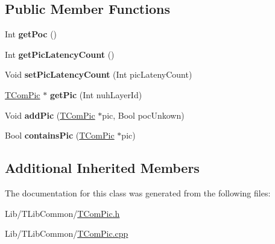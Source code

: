 \subsection*{Public Member Functions}
\begin{DoxyCompactItemize}
\item 
\mbox{\label{class_t_com_au_a420bdb61000304b8cd99b3882d5ed39a}} 
Int {\bfseries get\+Poc} ()
\item 
\mbox{\label{class_t_com_au_a7ca4e89ce5b5338c6aeb6eedb82ace1d}} 
Int {\bfseries get\+Pic\+Latency\+Count} ()
\end{DoxyCompactItemize}
{\bf }\par
\begin{DoxyCompactItemize}
\item 
\mbox{\label{class_t_com_au_a7938ae0485f1a9bbc0e04e8a3f72220d}} 
Void {\bfseries set\+Pic\+Latency\+Count} (Int pic\+Lateny\+Count)
\item 
\mbox{\label{class_t_com_au_a15ad28d9f7c42514989948eeb9680459}} 
\hyperlink{class_t_com_pic}{T\+Com\+Pic} $\ast$ {\bfseries get\+Pic} (Int nuh\+Layer\+Id)
\item 
\mbox{\label{class_t_com_au_ac9049c176a900bdbfa5d28698d634ab0}} 
Void {\bfseries add\+Pic} (\hyperlink{class_t_com_pic}{T\+Com\+Pic} $\ast$pic, Bool poc\+Unkown)
\item 
\mbox{\label{class_t_com_au_a75386210163f6e8febbd1320e1d3a875}} 
Bool {\bfseries contains\+Pic} (\hyperlink{class_t_com_pic}{T\+Com\+Pic} $\ast$pic)
\end{DoxyCompactItemize}

\subsection*{Additional Inherited Members}


The documentation for this class was generated from the following files\+:\begin{DoxyCompactItemize}
\item 
Lib/\+T\+Lib\+Common/\hyperlink{_t_com_pic_8h}{T\+Com\+Pic.\+h}\item 
Lib/\+T\+Lib\+Common/\hyperlink{_t_com_pic_8cpp}{T\+Com\+Pic.\+cpp}\end{DoxyCompactItemize}
